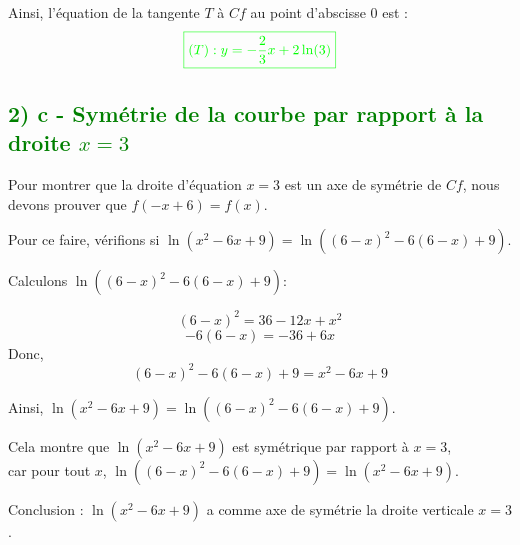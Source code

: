 \documentclass[12pt]{article}
\begin{document}
Ainsi, l'équation de la tangente \( T \) à \( Cf \) au point d'abscisse \( 0 \) est :
\[\textcolor{green}{\boxed{
(T):y = - \frac{2}{3} x + 2 \ln(3)
}}\]

\subsection*{\textcolor{green}{2) c - Symétrie de la courbe par rapport à la droite \( x = 3 \)}}

Pour montrer que la droite d'équation \( x = 3 \) est un axe de symétrie de \( Cf \), nous devons prouver que \( f(-x+6) = f(x) \).

Pour ce faire, vérifions si \( \ln(x^{2}-6x+9) = \ln((6-x)^{2}-6(6-x)+9) \).

Calculons \( \ln((6-x)^{2}-6(6-x)+9) \):

\[
(6-x)^{2} = 36 - 12x + x^{2}
\]
\[
-6(6-x) = -36 + 6x
\]
Donc,
\[
(6-x)^{2} - 6(6-x) + 9 = x^{2} - 6x + 9
\]

Ainsi, \( \ln(x^{2}-6x+9) = \ln((6-x)^{2}-6(6-x)+9) \).

Cela montre que \( \ln(x^{2}-6x+9) \) est symétrique par rapport à \( x = 3 \),\\ car pour tout \( x \), \( \ln((6-x)^{2}-6(6-x)+9) = \ln(x^{2}-6x+9) \).

Conclusion : \( \ln(x^{2}-6x+9) \) a comme axe de symétrie la droite verticale \( x = 3 \).
\end{document}
